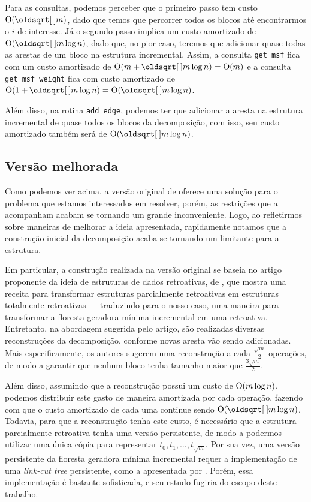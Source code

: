 Para as consultas, podemos perceber que o primeiro passo tem custo $\Oh(\sqrt{m})$, dado que temos que percorrer todos os blocos até encontrarmos o $i$ de interesse. Já o segundo passo implica um custo amortizado de $\Oh(\sqrt{m} \log n)$, dado que, no pior caso, teremos que adicionar quase todas as arestas de um bloco na estrutura incremental. Assim, a consulta \texttt{get\_msf} fica com um custo amortizado de $\Oh(m + \sqrt{m} \log n) = \Oh(m)$ e a consulta \texttt{get\_msf\_weight} fica com custo amortizado de $\Oh(1 + \sqrt{m} \log n) = \Oh(\sqrt{m} \log n)$.

Além disso, na rotina \texttt{add\_edge}, podemos ter que adicionar a aresta na estrutura incremental de quase todos os blocos da decomposição, com isso, seu custo amortizado também será de $\Oh(\sqrt{m} \log n)$.

\subsection{Versão melhorada}
\label{sec:rmsf-versao-mel}

Como podemos ver acima, a versão original de \citet{10.1093/comjnl/bxaa135} oferece uma solução para o problema que estamos interessados em resolver, porém, as restrições que a acompanham acabam se tornando um grande inconveniente. Logo, ao refletirmos sobre maneiras de melhorar a ideia apresentada, rapidamente notamos que a construção inicial da decomposição acaba se tornando um limitante para a estrutura.

Em particular, a construção realizada na versão original se baseia no artigo proponente da ideia de estruturas de dados retroativas, de \citet{10.1145/1240233.1240236}, que mostra uma receita para transformar estruturas parcialmente retroativas em estruturas totalmente retroativas --- traduzindo para o nosso caso, uma maneira para transformar a floresta geradora mínima incremental em uma retroativa. Entretanto, na abordagem sugerida pelo artigo, são realizadas diversas reconstruções da decomposição, conforme novas aresta vão sendo adicionadas. Mais especificamente, os autores sugerem uma reconstrução a cada $\frac{\sqrt{m}}{2}$ operações, de modo a garantir que nenhum bloco tenha tamanho maior que $\frac{3\sqrt{m}}{2}$.

Além disso, assumindo que a reconstrução possui um custo de $\mathrm{O}(m \log n)$, podemos distribuir este gasto de maneira amortizada por cada operação, fazendo com que o custo amortizado de cada uma continue sendo $\Oh(\sqrt{m} \log n)$. Todavia, para que a reconstrução tenha este custo, é necessário que a estrutura parcialmente retroativa tenha uma versão persistente, de modo a  podermos utilizar uma única cópia para representar $t_0, t_1, \dots, t_{\sqrt{m}}$. Por sua vez, uma versão persistente da floresta geradora mínima incremental requer a implementação de uma \emph{link-cut tree} persistente, como a apresentada por \citet{10.1007/978-3-540-69903-3_16}. Porém, essa implementação é bastante sofisticada, e seu estudo fugiria do escopo deste trabalho.

